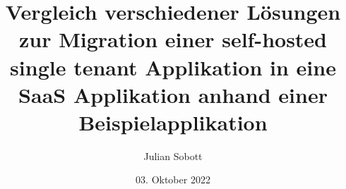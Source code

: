 \documentclass[oneside]{ausarbeitung}
\begin{document}

    \Expose


    \Informatik

    \title{Vergleich verschiedener Lösungen zur Migration einer self-hosted single tenant Applikation in eine SaaS Applikation anhand einer Beispielapplikation}

    \author{Julian Sobott }

   \examinerIsAProfessortrue   %


    \date{03. Oktober 2022}



    \maketitle
    \cleardoublepage


\makeworkplace


    \setcounter{page}{1}
    \cleardoublepage

    

    \appendix
    \printbibliography
\end{document}
